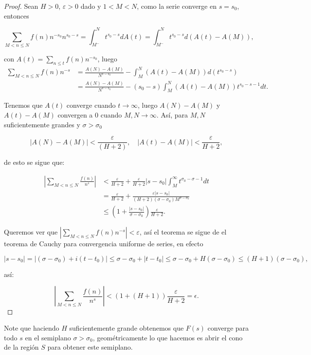 \begin{proof}
Sean $H>0$, $\varepsilon>0$ dado y $1<M<N$, como la serie converge en $s=s_0$, entonces

$$\sum_{M<n \leq N} f(n) n^{-s_0} n^{s_0-s}=\int_{M^-}^{N} t^{s_0-s} d A(t)=\int_{M^{-}}^N t^{s_0-s} d(A(t)-A(M)),$$

con $A(t)=\displaystyle\sum_{n \leq t} f(n) n^{-s_0}$, luego
$$
\begin{aligned}
\sum_{M<n \leq N} f(n) n^{-s} & =\frac{A(N)-A(M)}{N^{s-s_0}}- \int_M^N(A(t)-A(M)) d(t^{s_0-s})\\
&=\frac{A(N)-A(M)}{N^{s-s_0}}-(s_0-s)\int_M^N(A(t)-A(M))t^{s_0-s-1}dt.
\end{aligned}
$$

Tenemos que $A(t)$ converge cuando $t\to\infty$, luego $A(N)-A(M)$ y $A(t)-A(M)$ convergen a 0 cuando $M,N\to \infty$. Así, para $M, N$ suficientemente grandes y $\sigma>\sigma_0$

$$|A(N)-A(M)|<\frac{\varepsilon}{(H+2)}, \quad|A(t)-A(M)|<\frac{\varepsilon}{H+2},$$

de esto se sigue que:

$$\begin{aligned}
\left|\sum_{M<n \leq N} \frac{f(n)}{n^s}\right|&<\frac{\varepsilon}{H+2}+\frac{\varepsilon}{H+2}\left|s-s_0\right| \int_M^{\infty} t^{\sigma_0-\sigma-1} d t\\
&=\frac{\varepsilon}{H+2}+\frac{\varepsilon\left|s-s_0\right|}{(H+2)\left(\sigma-\sigma_0\right) M^{\sigma-\sigma_0}}\\
&\leq\left(1+\frac{\left|s-s_0\right|}{\sigma-\sigma_0}\right) \frac{\varepsilon}{H+2} .
\end{aligned}$$

Queremos ver que $\left|\displaystyle\sum_{M<n \leq N} f(n) n^{-s}\right|<\varepsilon$, así el teorema se sigue de el teorema de Cauchy para convergencia uniforme de series, en efecto

$$\left|s-s_0\right|=\left|\left(\sigma-\sigma_0\right)+i\left(t-t_0\right)\right| \leq \sigma-\sigma_0+\left|t-t_0\right| \leq\sigma-\sigma_0+H(\sigma-\sigma_0)\leq(H+1)\left(\sigma-\sigma_0\right),$$

así:

$$\left|\sum_{M<n \leq N} \frac{f(n)}{n^s}\right|<(1+(H+1))\frac{\varepsilon}{H+2}=\epsilon.$$
\end{proof}


Note que haciendo $H$ suficientemente grande obtenemos que $F(s)$ converge para todo  $s$ en el semiplano $\sigma>\sigma_0$, geométricamente lo que hacemos es abrir el cono de la región $S$ para obtener este semiplano.\cite{montgomery2007multiplicative}

